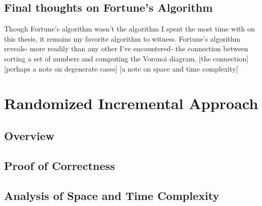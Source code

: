 \documentclass[12pt,twoside]{reedthesis}
\makeatletter
\let\OldStatex\Statex
\renewcommand{\Statex}[1][3]{%
  \setlength\@tempdima{\algorithmicindent}%
  \OldStatex\hskip\dimexpr#1\@tempdima\relax}
\makeatother
\begin{document}
  \begin{algorithm}[H]
  \end{algorithm}

  \begin{algorithm}[H]
  \end{algorithm}

  \subsection{Final thoughts on Fortune's Algorithm} %
  \label{sub:final_thoughts_on_fortune_s_algorithm}
  Though Fortune's algorithm wasn't the algorithm I spent the most time with on this thesis, it remains my favorite algorithm to witness. Fortune's algorithm reveals- more readily than any other I've encountered- the connection between sorting a set of numbers and computing the Voronoi diagram. [the connection]
  [perhaps a note on degenerate cases]
  [a note on space and time complexity] 

  \section{Randomized Incremental Approach}
    \subsection{Overview}
    \subsection{Proof of Correctness}
    \subsection{Analysis of Space and Time Complexity}
\end{document}
